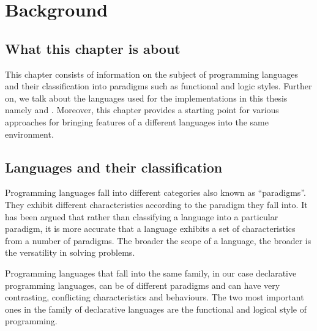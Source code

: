 \documentclass[thesis-solanki.tex]{subfiles}
\begin{document}
\chapter{Background}\label{chap:background}

\section{What this chapter is about}

This chapter consists of information on the subject of programming languages and their classification into paradigms such as functional and 
logic styles. Further on, we talk about the languages used for the implementations in this thesis namely  and 
. Moreover, this chapter provides a starting point for various approaches for bringing features of a different languages 
into the same environment.


\section{Languages and their classification}
Programming languages fall into different categories also known as ``paradigms''.
They exhibit different characteristics according to the paradigm they fall into.
It has been argued \cite{Krishnamurthi:2008:TPL:1480828.1480846} that rather than classifying a language into a
particular paradigm, it is more accurate that a language exhibits a set of characteristics from a number of
paradigms.
The broader the scope of a language, the broader is the versatility in solving problems.

Programming languages that fall into the same family, in our case declarative programming languages, can be of
different paradigms and can have very contrasting, conflicting characteristics and behaviours.
The two most important ones in the family of declarative languages are the functional and
logical style of programming.
\end{document}
